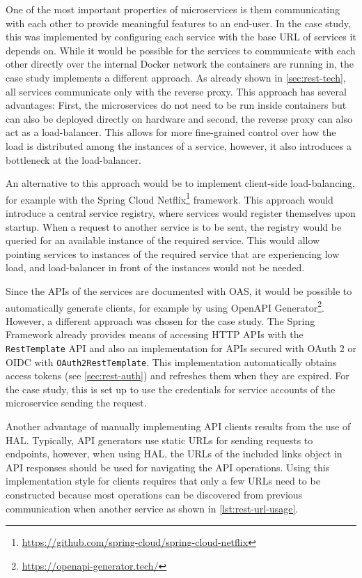 One of the most important properties of microservices is them communicating with each other to provide meaningful features to an end-user.
In the case study, this was implemented by configuring each service with the base \ac{URL} of services it depends on.
While it would be possible for the services to communicate with each other directly over the internal Docker network the containers are running in, the case study implements a different approach.
As already shown in \autoref{sec:rest-tech}, all services communicate only with the reverse proxy.
This approach has several advantages:
First, the microservices do not need to be run inside containers but can also be deployed directly on hardware and second, the reverse proxy can also act as a load-balancer.
This allows for more fine-grained control over how the load is distributed among the instances of a service, however, it also introduces a bottleneck at the load-balancer.

An alternative to this approach would be to implement client-side load-balancing, for example with the Spring Cloud Netflix\footnote{\url{https://github.com/spring-cloud/spring-cloud-netflix}} framework.
This approach would introduce a central service registry, where services would register themselves upon startup.
When a request to another service is to be sent, the registry would be queried for an available instance of the required service.
This would allow pointing services to instances of the required service that are experiencing low load, and load-balancer in front of the instances would not be needed.

Since the \acp{API} of the services are documented with \ac{OAS}, it would be possible to automatically generate clients, for example by using Open\ac{API} Generator\footnote{\url{https://openapi-generator.tech/}}.
However, a different approach was chosen for the case study.
The Spring Framework already provides means of accessing \ac{HTTP} \acp{API} with the \texttt{RestTemplate} \ac{API} and also an implementation for \acp{API} secured with OAuth 2 or \ac{OIDC} with \texttt{OAuth2RestTemplate}.
This implementation automatically obtains access tokens (see \autoref{sec:rest-auth}) and refreshes them when they are expired.
For the case study, this is set up to use the credentials for service accounts of the microservice sending the request.

Another advantage of manually implementing \ac{API} clients results from the use of \ac{HAL}.
Typically, \ac{API} generators use static \acp{URL} for sending requests to endpoints, however, when using \ac{HAL}, the \acp{URL} of the included links object in \ac{API} responses should be used for navigating the \ac{API} operations.
Using this implementation style for clients requires that only a few \acp{URL} need to be constructed because most operations can be discovered from previous communication when another service as shown in \autoref{lst:rest-url-usage}.

